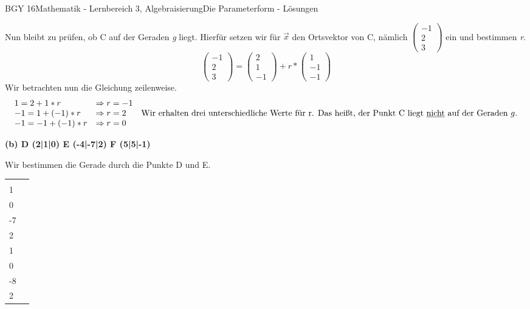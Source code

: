 \documentclass[oneside,openany,headings=optiontotoc,11pt,numbers=noenddot]{scrreprt}
\begin{document}
\begin{worksheet}{BGY 16}{Mathematik - Lernbereich 3, Algebraisierung}{Die Parameterform - Lösungen}
\begin{framed}
			\par\noindent
			Nun bleibt zu prüfen, ob C auf der Geraden \textit{g} liegt. Hierfür setzen wir für \(\vec{x}\)	den Ortsvektor von C, nämlich \(\left(\begin{array}{c}-1\\2\\3\end{array}\right)\) ein und bestimmen \textit{r}.\\
			\[\left(\begin{array}{c}-1\\2\\3\end{array}\right) = \left(\begin{array}{c}2 \\ 1 \\ -1\end{array}\right) + r*\left(\begin{array}{c}1\\-1\\-1\end{array}\right)\]
			Wir betrachten nun die Gleichung zeilenweise.
			\[\begin{array}{llc}
			1 = 2 + 1*r & \Rightarrow r = -1&\\
			-1 = 1 + (-1)*r & \Rightarrow r = 2&\text{Wir erhalten drei unterschiedliche Werte für r. Das heißt, der Punkt C liegt \underline{nicht} auf der Geraden } g.\\
			-1 = -1 + (-1)*r & \Rightarrow r = 0\\
			\end{array}\]
			\par
			\textbf{(b) D (2|1|0) E (-4|-7|2) F (5|5|-1)}\\
			\par\noindent
			Wir bestimmen die Gerade durch die Punkte D und E.\\
			\par\noindent
			\begin{tabularx}{\textwidth}{XX}
				\(\overrightarrow{OD} = \vec{D} -\vec{O} = \left(\begin{array}{c}2\\1\\0\end{array}\right)\) & \(\overrightarrow{DE} = \vec{E} -\vec{D} = \left(\begin{array}{c}-4\\-7\\2\end{array}\right) - \left(\begin{array}{c}2\\1\\0\end{array}\right) = \left(\begin{array}{c}-6\\-8\\2\end{array}\right)\)

\end{tabularx}
\end{framed}
\end{worksheet}
\end{document}
